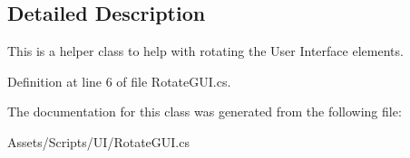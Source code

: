 \subsection{Detailed Description}
This is a helper class to help with rotating the User Interface elements. 



Definition at line 6 of file Rotate\+G\+U\+I.\+cs.



The documentation for this class was generated from the following file\+:\begin{DoxyCompactItemize}
\item 
Assets/\+Scripts/\+U\+I/Rotate\+G\+U\+I.\+cs\end{DoxyCompactItemize}
